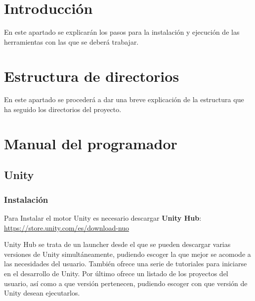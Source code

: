 
\section{Introducción}
En este apartado se explicarán los pasos para la instalación y ejecución de las herramientas con las que se deberá trabajar.

\section{Estructura de directorios}
En este apartado se procederá a dar una breve explicación de la estructura que ha seguido los directorios del proyecto.\\




\section{Manual del programador}
\subsection{Unity}\label{sub:Unity}
\subsubsection{Instalación}

Para Instalar el motor Unity es necesario descargar \textbf{Unity Hub}: \url{https://store.unity.com/es/download-nuo}

Unity Hub se trata de un launcher desde el que se pueden descargar varias versiones de Unity simultáneamente, pudiendo escoger la que mejor se acomode a las necesidades del usuario. También ofrece una serie de tutoriales para iniciarse en el desarrollo de Unity. Por último ofrece un listado de los proyectos del usuario, así como a que versión pertenecen, pudiendo escoger con que versión de Unity desean ejecutarlos.

